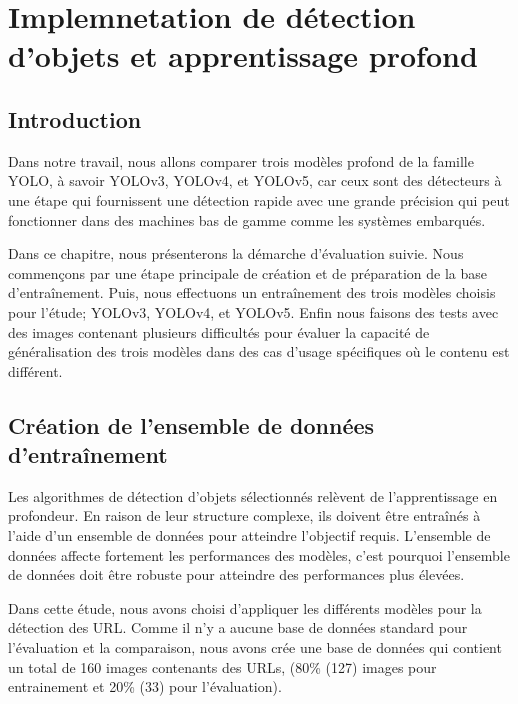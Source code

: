 %

\chapter{Implemnetation de détection d'objets et apprentissage profond}
\newpage
\pagestyle{fancy}
\fancyhead[L]{\chaptername \ \thechapter}
\renewcommand{\headrulewidth}{1pt}
\fancyfoot[C]{\thepage}

\section{Introduction} 
Dans notre travail, nous allons comparer trois modèles profond de la 
famille YOLO, à savoir YOLOv3, YOLOv4, et YOLOv5, car ceux sont des détecteurs à une étape qui fournissent une détection rapide avec une grande précision qui peut fonctionner dans des machines bas de gamme comme les systèmes embarqués.

Dans ce chapitre, nous présenterons la démarche d'évaluation suivie.
Nous commençons par une étape principale de création et de préparation de la base d'entraînement. Puis, nous effectuons un entraînement des trois modèles choisis pour l'étude; YOLOv3, YOLOv4, et YOLOv5. Enfin nous faisons des tests avec des images contenant plusieurs difficultés pour évaluer la capacité de généralisation des trois modèles dans des cas d'usage  spécifiques où le contenu est différent. 

\section{Création de l'ensemble de données d'entraînement}
Les algorithmes de détection d'objets sélectionnés relèvent de l'apprentissage en profondeur. En raison de leur structure complexe,  ils doivent être entraînés à l'aide d'un ensemble de données pour atteindre l'objectif requis. L'ensemble de données affecte fortement les performances des modèles, c'est pourquoi l'ensemble de données doit être robuste pour atteindre des performances plus élevées.


Dans cette étude, nous avons choisi d'appliquer les différents modèles pour la détection des URL. Comme il n'y a aucune base de données standard pour l'évaluation et la comparaison, nous avons crée une base de données qui contient un total de 160 images contenants des URLs, (80\% (127) images pour entrainement et 20\% (33) pour l'évaluation). \\


